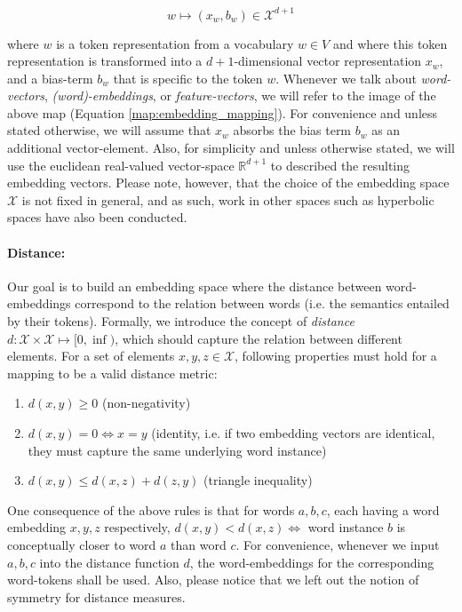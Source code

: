 \documentclass[a4paper,12pt,twoside,openright]{report}
\begin{document}
\begin{equation}
\label{map:embedding_mapping}
w \mapsto (x_w, b_w) \in \mathcal{X}^{d + 1}
\end{equation}

where $w$ is a token representation from a vocabulary $w \in V$ and where this token representation is transformed into a $d+1$-dimensional vector representation $x_w$, and a bias-term $b_w$ that is specific to the token $w$.
Whenever we talk about \textit{word-vectors}, \textit{(word)-embeddings}, or \textit{feature-vectors}, we will refer to the image of the above map (Equation \ref{map:embedding_mapping}). 
For convenience and unless stated otherwise, we will assume that $x_w$ absorbs the bias term $b_w$ as an additional vector-element.
Also, for simplicity and unless otherwise stated, we will use the euclidean real-valued vector-space $\mathbb{R}^{d+1}$ to described the resulting embedding vectors.
Please note, however, that the choice of the embedding space $\mathcal{X}$ is not fixed in general, and as such, work in other spaces such as hyperbolic spaces  \cite{ganea18} have also been conducted. 

\paragraph{Distance:} Our goal is to build an embedding space where the distance between word-embeddings correspond to the relation between words (i.e. the semantics entailed by their tokens).
Formally, we introduce the concept of \textit{distance} $d : \mathcal{X}  \times \mathcal{X} \mapsto [ 0, \inf )$, which should capture the relation between different elements. 
For a set of elements $x, y, z \in \mathcal{X}$, following properties must hold for a mapping to be a valid distance metric:

\begin{enumerate}
\item $d(x, y) \geq 0$ (non-negativity)
\item $d(x, y) = 0 \iff x = y$ (identity, i.e. if two embedding vectors are identical, they must capture the same underlying word instance)
\item $d(x, y) \leq d(x, z) + d(z, y)$ (triangle inequality)
\end{enumerate}{\label{def:distance}}

One consequence of the above rules is that for words $a, b, c$, each having a word embedding $x, y, z$ respectively, $d(x, y) < d(x, z) \iff $ word instance $b$ is conceptually closer to word $a$ than word $c$.
For convenience, whenever we input $a, b, c$ into the distance function $d$, the word-embeddings for the corresponding word-tokens shall be used.
Also, please notice that we left out the notion of symmetry for distance measures.
\end{document}
